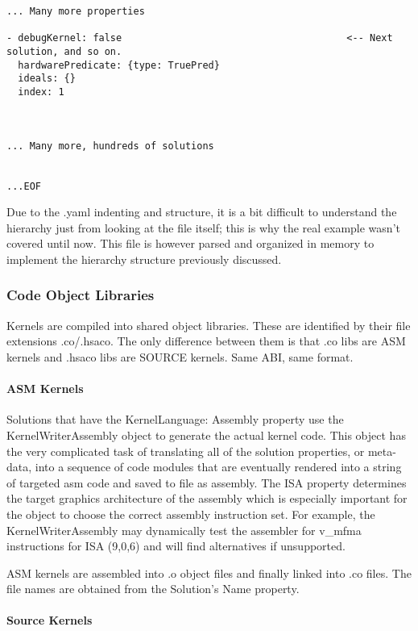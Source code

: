 \documentclass[]{article}
\begin{document}
\begin{verbatim}
... Many more properties

- debugKernel: false                                       <-- Next solution, and so on. 
  hardwarePredicate: {type: TruePred}
  ideals: {}
  index: 1



... Many more, hundreds of solutions


...EOF
\end{verbatim} 


Due to the .yaml indenting and structure, it is a bit difficult to understand the hierarchy just from looking at the file itself; this is why the real example wasn't covered until now. This file is however parsed and organized in memory to implement the hierarchy structure previously discussed.

\subsubsection{Code Object Libraries}

Kernels are compiled into shared object libraries. These are identified by their file extensions .co/.hsaco. The only difference between them is that .co libs are ASM kernels and .hsaco libs are SOURCE kernels. Same ABI, same format.

\paragraph{ASM Kernels}

Solutions that have the KernelLanguage: Assembly property use the KernelWriterAssembly object to generate the actual kernel code. This object has the very complicated task of translating all of the solution properties, or meta-data, into a sequence of code modules that are eventually rendered into a string of targeted asm code and saved to file as assembly. The ISA property determines the target graphics architecture of the assembly which is especially important for the object to choose the correct assembly instruction set. For example, the KernelWriterAssembly may dynamically test the assembler for v\_mfma instructions for ISA (9,0,6) and will find alternatives if unsupported.

ASM kernels are assembled into .o object files and finally linked into .co files. The file names are obtained from the Solution's Name property.

\paragraph{Source Kernels}
\end{document}
